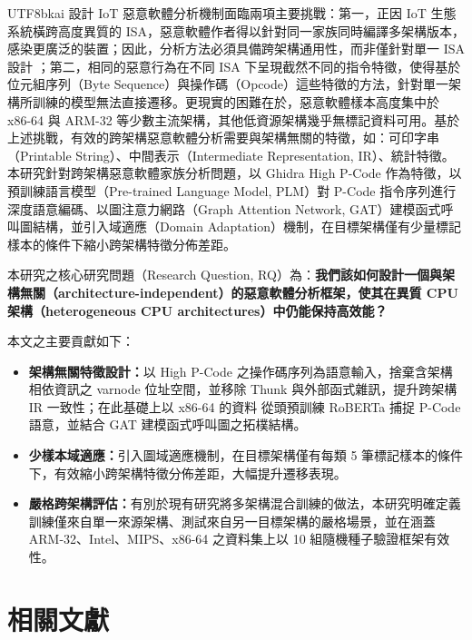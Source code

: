 \documentclass[10pt, a4paper, twocolumn]{article}
\begin{document}
\begin{CJK*}{UTF8}{bkai}
設計 IoT 惡意軟體分析機制面臨兩項主要挑戰：第一，正因 IoT 生態系統橫跨高度異質的 ISA，惡意軟體作者得以針對同一家族同時編譯多架構版本，感染更廣泛的裝置；因此，分析方法必須具備跨架構通用性，而非僅針對單一 ISA 設計 \cite{alhanahnah2018efficient}；第二，相同的惡意行為在不同 ISA 下呈現截然不同的指令特徵，使得基於位元組序列（Byte Sequence）與操作碼（Opcode）這些特徵的方法，針對單一架構所訓練的模型無法直接遷移。更現實的困難在於，惡意軟體樣本高度集中於 x86-64 與 ARM-32 等少數主流架構，其他低資源架構幾乎無標記資料可用。基於上述挑戰，有效的跨架構惡意軟體分析需要與架構無關的特徵，如：可印字串（Printable String）、中間表示（Intermediate Representation, IR）、統計特徵。
本研究針對跨架構惡意軟體家族分析問題，以 Ghidra High P-Code 作為特徵，以預訓練語言模型（Pre-trained Language Model, PLM）對 P-Code 指令序列進行深度語意編碼、以圖注意力網路（Graph Attention Network, GAT）建模函式呼叫圖結構，並引入域適應（Domain Adaptation）機制，在目標架構僅有少量標記樣本的條件下縮小跨架構特徵分佈差距。

本研究之核心研究問題（Research Question, RQ）為：\textbf{我們該如何設計一個與架構無關（architecture-independent）的惡意軟體分析框架，使其在異質 CPU 架構（heterogeneous CPU architectures）中仍能保持高效能？}

本文之主要貢獻如下：
\begin{itemize}
  \item \textbf{架構無關特徵設計：}以 High P-Code 之操作碼序列為語意輸入，捨棄含架構相依資訊之 varnode 位址空間，並移除 Thunk 與外部函式雜訊，提升跨架構 IR 一致性；在此基礎上以 x86-64 的資料  從頭預訓練 RoBERTa 捕捉 P-Code 語意，並結合 GAT 建模函式呼叫圖之拓樸結構。
  \item \textbf{少樣本域適應：}引入圖域適應機制，在目標架構僅有每類 5 筆標記樣本的條件下，有效縮小跨架構特徵分佈差距，大幅提升遷移表現。
  \item \textbf{嚴格跨架構評估：}有別於現有研究\cite{vasan2020mthael,chaganti2022deep,ravi2022attention}將多架構混合訓練的做法，本研究明確定義訓練僅來自單一來源架構、測試來自另一目標架構的嚴格場景，並在涵蓋 ARM-32、Intel、MIPS、x86-64 之資料集上以 10 組隨機種子驗證框架有效性。
\end{itemize}


\section{相關文獻}


\end{CJK*}
\end{document}
